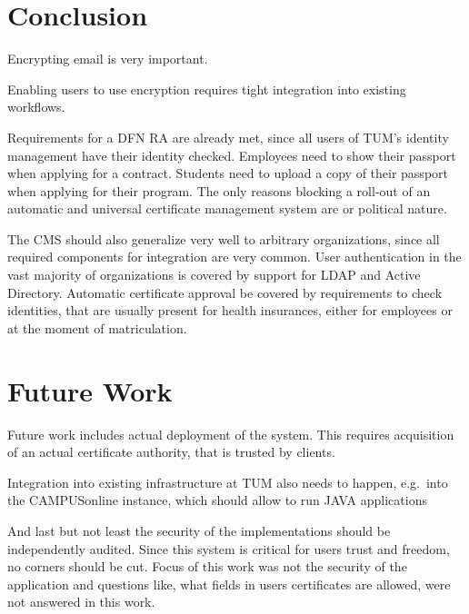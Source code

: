 









\chapter{Conclusion}\label{ch:conclusion}
Encrypting email is very important.

Enabling users to use encryption requires tight integration into existing workflows.

Requirements for a DFN RA are already met, since all users of TUM's identity management have their identity checked.
Employees need to show their passport when applying for a contract.
Students need to upload a copy of their passport when applying for their program.
The only reasons blocking a roll-out of an automatic and universal certificate management system are or political
nature.

The CMS should also generalize very well to arbitrary organizations, since all required components for integration are
very common.
User authentication in the vast majority of organizations is covered by support for LDAP and Active Directory.
Automatic certificate approval be covered by requirements to check identities, that are usually present for health
insurances, either for employees or at the moment of matriculation.

\chapter{Future Work}\label{ch:futureWork}

Future work includes actual deployment of the system.
This requires acquisition of an actual certificate authority, that is trusted by clients.

Integration into existing infrastructure at TUM also needs to happen, e.g.\ into the CAMPUSonline instance, which should
allow to run JAVA applications

And last but not least the security of the implementations should be independently audited.
Since this system is critical for users trust and freedom, no corners should be cut.
Focus of this work was not the security of the application and questions like, what fields in users certificates are
allowed, were not answered in this work.
